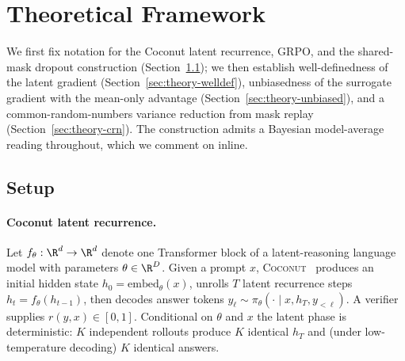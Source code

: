 
\section{Theoretical Framework}
\label{sec:theory}
\label{sec:prelim}

We first fix notation for the Coconut latent recurrence, GRPO, and the
shared-mask dropout construction (Section~\ref{sec:theory-setup}); we
then establish well-definedness of the latent gradient
(Section~\ref{sec:theory-welldef}), unbiasedness of the surrogate
gradient with the mean-only advantage
(Section~\ref{sec:theory-unbiased}), and a common-random-numbers
variance reduction from mask replay
(Section~\ref{sec:theory-crn}).  The construction admits a Bayesian
model-average reading throughout, which we comment on inline.

\subsection{Setup}
\label{sec:theory-setup}

\paragraph{Coconut latent recurrence.}
Let $f_\theta : \R^d \to \R^d$ denote one Transformer block of a
latent-reasoning language model with parameters $\theta \in \R^D$.
Given a prompt $x$, \textsc{Coconut}~\citep{hao2024coconut} produces
an initial hidden state $h_0 = \mathrm{embed}_\theta(x)$, unrolls $T$
latent recurrence steps $h_t = f_\theta(h_{t-1})$, then decodes answer
tokens $y_\ell \sim \pi_\theta(\cdot \mid x, h_T, y_{<\ell})$.  A
verifier supplies $r(y, x) \in [0,1]$.  Conditional on $\theta$ and
$x$ the latent phase is deterministic: $K$ independent rollouts
produce $K$ identical $h_T$ and (under low-temperature decoding)
$K$ identical answers.

